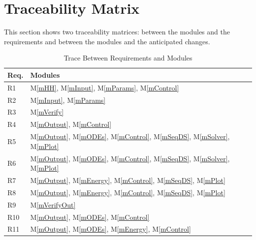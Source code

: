 \documentclass[12pt, titlepage]{article}
\newcommand{\mref}[1]{M\ref{#1}}
\begin{document}
\newpage

\section{Traceability Matrix} \label{SecTM}

This section shows two traceability matrices: between the modules and the requirements and between
the modules and the anticipated changes.

\begin{table}[H]
	\centering
	\begin{tabular}{p{} p{}}
		\toprule
		\textbf{Req.} & \textbf{Modules}                                                                           \\
		\midrule
		R1            & \mref{mHH}, \mref{mInput}, \mref{mParams}, \mref{mControl}                                 \\
		R2            & \mref{mInput}, \mref{mParams}                                                              \\
		R3            & \mref{mVerify}                                                                             \\
		R4            & \mref{mOutput}, \mref{mControl}                                                            \\
		R5            & \mref{mOutput}, \mref{mODEs}, \mref{mControl}, \mref{mSeqDS}, \mref{mSolver}, \mref{mPlot} \\
		R6            & \mref{mOutput}, \mref{mODEs}, \mref{mControl}, \mref{mSeqDS}, \mref{mSolver}, \mref{mPlot} \\
		R7            & \mref{mOutput}, \mref{mEnergy}, \mref{mControl}, \mref{mSeqDS}, \mref{mPlot}               \\
		R8            & \mref{mOutput}, \mref{mEnergy}, \mref{mControl}, \mref{mSeqDS}, \mref{mPlot}               \\
		R9            & \mref{mVerifyOut}                                                                          \\
		R10           & \mref{mOutput}, \mref{mODEs}, \mref{mControl}                                              \\
		R11           & \mref{mOutput}, \mref{mODEs}, \mref{mEnergy}, \mref{mControl}                              \\
		\bottomrule
	\end{tabular}
	\caption{Trace Between Requirements and Modules}
	\label{TblRT}
\end{table}
\end{document}
